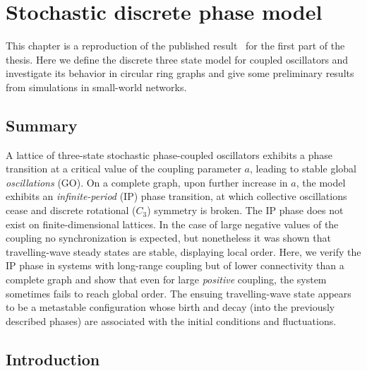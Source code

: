 \chapter{Stochastic discrete phase model}
\label{chap:article}

This chapter is a reproduction of the published result~\cite{rodrigues2020synchronization} for the first part of the thesis. Here we
define the discrete three state model for coupled oscillators and investigate its behavior in circular ring graphs and give some
preliminary results from simulations in small-world networks.

\section{Summary}

A lattice of three-state stochastic phase-coupled oscillators exhibits a phase transition at a critical value of the coupling parameter
$a$, leading to stable global \textit{oscillations} (GO). On a complete graph, upon further increase in $a$, the model exhibits an
\textit{infinite-period} (IP) phase transition, at which collective oscillations cease and discrete rotational ($C_3$) symmetry is
broken. The IP phase does not exist on finite-dimensional lattices.  In the case of large negative values of the coupling no
synchronization is expected, but nonetheless it was shown that travelling-wave steady states are stable, displaying local order. Here,
we verify the IP phase in systems with long-range coupling but of lower connectivity than a complete graph and show that even for large
\textit{ positive} coupling, the system sometimes fails to reach global order. The ensuing travelling-wave state appears to be a
metastable configuration whose birth and decay (into the previously described phases) are associated with the initial conditions and
fluctuations.

\section{Introduction}

